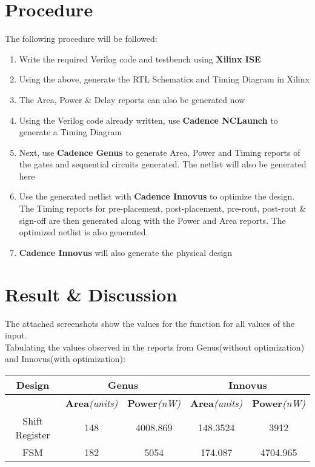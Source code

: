 \documentclass[a4paper,10pt]{report}
\begin{document}
\section{Procedure}
The following procedure will be followed:
\begin{enumerate}
	\item Write the required Verilog code and testbench using \textbf{Xilinx ISE}
	\item Using the above, generate the RTL Schematics and Timing Diagram in Xilinx
	\item The Area, Power \& Delay reports can also be generated now
	\item Using the Verilog code already written, use \textbf{Cadence NCLaunch} to generate a Timing Diagram
	\item Next, use \textbf{Cadence Genus} to generate Area, Power and Timing reports of the gates and sequential circuits generated. The netlist will also be generated here
	\item Use the generated netlist with \textbf{Cadence Innovus} to optimize the design. The Timing reports for pre-placement, post-placement, pre-rout, post-rout \& sign-off are then generated along with the Power and Area reports. The optimized netlist is also generated.
	\item \textbf{Cadence Innovus} will also generate the physical design
\end{enumerate}

\section{Result \& Discussion}

The attached screenshots show the values for the function for all values of the input. \\
Tabulating the values observed in the reports from Genus(without optimization) and Innovus(with optimization): \\

\begin{tabular}{|c|c|c|c|c|}
	\hline
	\textbf{Design} & \multicolumn{2}{|c|}{\textbf{Genus}} & \multicolumn{2}{|c|}{\textbf{Innovus}} \\
	\hline
     & \textbf{Area}\textit{(units)} & \textbf{Power}\textit{(nW)} & \textbf{Area}\textit{(units)} & \textbf{Power}\textit{(nW)} \\
     \hline
    Shift Register & 148 & 4008.869 & 148.3524 & 3912 \\
     \hline
    FSM & 182 & 5054 & 174.087 & 4704.965 \\
     \hline

\end{tabular} \\
\\
\end{document}
